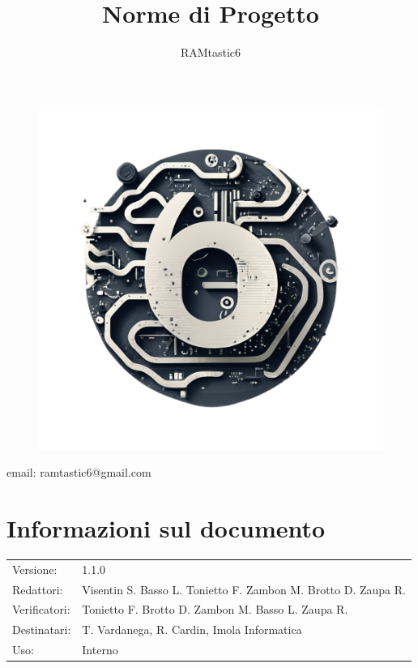 \documentclass[12pt, oneside]{article}
\author{RAMtastic6}
\begin{document}
\thispagestyle{empty}
\title{Norme di Progetto}
\maketitle
\begin{figure}[h]
  \centering
  \includegraphics[scale=0.3]{logo.png}
\end{figure}
\begin{center}
    email: ramtastic6@gmail.com
\end{center}

\section*{Informazioni sul documento}
\begin{tabular}{ll}
Versione: & 1.1.0 \\
Redattori: &  Visentin S. Basso L. Tonietto F. Zambon M. Brotto D. Zaupa R.\\
Verificatori: & Tonietto F. Brotto D. Zambon M. Basso L. Zaupa R. \\
Destinatari: & T. Vardanega, R. Cardin, Imola Informatica \\
Uso: & Interno
\end{tabular}
\newpage
\end{document}
